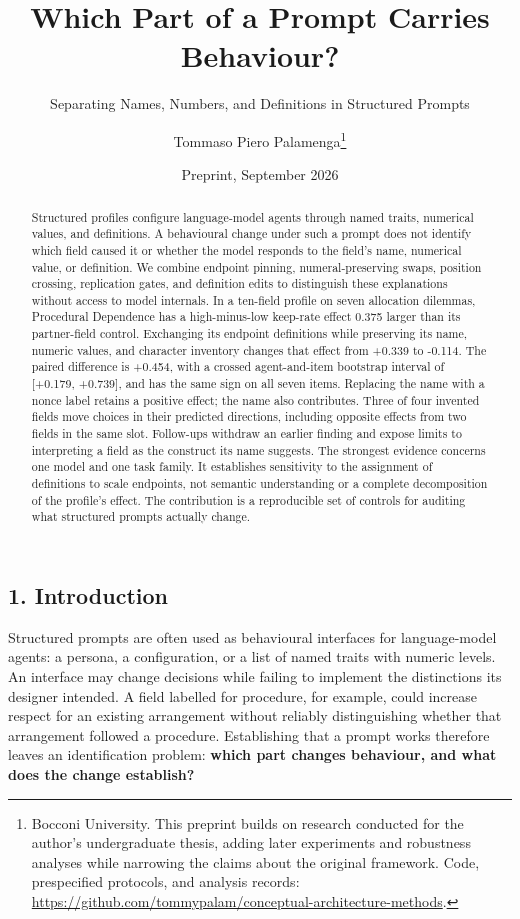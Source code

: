 \documentclass[
  11pt]{article}
\title{Which Part of a Prompt Carries Behaviour?}
\subtitle{Separating Names, Numbers, and Definitions in Structured
Prompts}
\author{Tommaso Piero Palamenga\footnote{Bocconi University. This
  preprint builds on research conducted for the author's undergraduate
  thesis, adding later experiments and robustness analyses while
  narrowing the claims about the original framework. Code, prespecified
  protocols, and analysis records:
  \url{https://github.com/tommypalam/conceptual-architecture-methods}.}}
\date{Preprint, September 2026}
\begin{document}
\maketitle
\begin{abstract}
Structured profiles configure language-model agents through named
traits, numerical values, and definitions. A behavioural change under
such a prompt does not identify which field caused it or whether the
model responds to the field's name, numerical value, or definition. We
combine endpoint pinning, numeral-preserving swaps, position crossing,
replication gates, and definition edits to distinguish these
explanations without access to model internals. In a ten-field profile
on seven allocation dilemmas, Procedural Dependence has a high-minus-low
keep-rate effect 0.375 larger than its partner-field control. Exchanging
its endpoint definitions while preserving its name, numeric values, and
character inventory changes that effect from +0.339 to -0.114. The
paired difference is +0.454, with a crossed agent-and-item bootstrap
interval of {[}+0.179, +0.739{]}, and has the same sign on all seven
items. Replacing the name with a nonce label retains a positive effect;
the name also contributes. Three of four invented fields move choices in
their predicted directions, including opposite effects from two fields
in the same slot. Follow-ups withdraw an earlier finding and expose
limits to interpreting a field as the construct its name suggests. The
strongest evidence concerns one model and one task family. It
establishes sensitivity to the assignment of definitions to scale
endpoints, not semantic understanding or a complete decomposition of the
profile's effect. The contribution is a reproducible set of controls for
auditing what structured prompts actually change.
\end{abstract}

\subsection{1. Introduction}\label{introduction}

Structured prompts are often used as behavioural interfaces for
language-model agents: a persona, a configuration, or a list of named
traits with numeric levels. An interface may change decisions while
failing to implement the distinctions its designer intended. A field
labelled for procedure, for example, could increase respect for an
existing arrangement without reliably distinguishing whether that
arrangement followed a procedure. Establishing that a prompt works
therefore leaves an identification problem: \textbf{which part changes
behaviour, and what does the change establish?}
\end{document}
